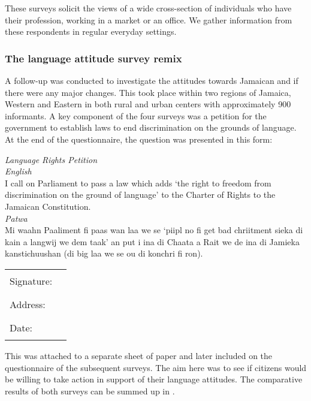 \documentclass[output=paper,colorlinks,citecolor=brown]{langscibook}
\begin{document}
These surveys solicit the views of a wide cross-section of individuals who have their profession, working in a market or an office. We gather information from these respondents in regular everyday settings. 

\subsubsection{The language attitude survey remix}

A follow-up \citet{JamaicanLanguageUnit2015} was conducted to investigate the attitudes towards Jamaican and if there were any major changes. This took place within two regions of Jamaica, Western and Eastern in both rural and urban centers with approximately 900 informants. A key component of the four surveys was a petition for the government to establish laws to end discrimination on the grounds of language. At the end of the questionnaire, the question was presented in this form:

\ea
    {\textit{Language Rights Petition}}\smallskip\\ 
    {\textit{English}}\smallskip\\
    I call on Parliament to pass a law which adds ‘the right to freedom from discrimination on the ground of language’ to the Charter of Rights to the Jamaican Constitution.\medskip\\
    {\textit{Patwa}}\smallskip\\
    Mi waahn Paaliment fi paas wan laa we se ‘piipl no fi get bad chriitment sieka di kain a langwij we dem taak’ an put i ina di Chaata a Rait we de ina di Jamieka kanstichuushan (di big laa we se ou di konchri fi ron).\medskip\\
    \begin{tabular}{@{}ll@{}}
       Signature:  & \rule{7.5cm}{0.5pt}\\ 
       Address:    & \rule{7.5cm}{0.5pt}\\ 
       Date:       & \rule{7.5cm}{0.5pt}\\ 
    \end{tabular}
\z

This was attached to a separate sheet of paper and later included on the questionnaire of the subsequent surveys. The aim here was to see if citizens would be willing to take action in support of their language attitudes. The comparative results of both surveys can be summed up in .
\end{document}

